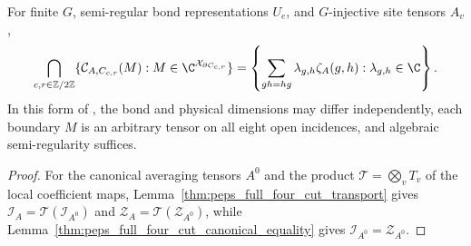 \begin{theorem}%
    \label{thm:peps_four_cut_closure}
    \leanok
    For finite $G$, semi-regular bond representations $U_e$, and
    $G$-injective site tensors $A_v$,
    \begin{align}
        \bigcap_{c,r\in\mathbb Z/2\mathbb Z}
        \{\mathcal C_{A,C_{c,r}}(M):M\in\C^{\mathcal X_{\partial C_{c,r}}}\}
        =\left\{\sum_{gh=hg}\lambda_{g,h}\zeta_A(g,h):
        \lambda_{g,h}\in\C\right\}.
        \label{eq:peps_full_four_cut_equality}
    \end{align}
    In this form of \cite[Theorem~5.5]{Schuch2010PEPS}, the bond and physical
    dimensions may differ independently, each boundary $M$ is an arbitrary
    tensor on all eight open incidences, and algebraic semi-regularity suffices.
\end{theorem}
\begin{proof}\leanok
    For the canonical averaging tensors $A^0$ and the product
    $\mathcal T=\bigotimes_vT_v$ of the local coefficient maps,
    Lemma~\ref{thm:peps_full_four_cut_transport} gives
    $\mathcal I_A=\mathcal T(\mathcal I_{A^0})$ and
    $\mathcal Z_A=\mathcal T(\mathcal Z_{A^0})$, while
    Lemma~\ref{thm:peps_full_four_cut_canonical_equality} gives
    $\mathcal I_{A^0}=\mathcal Z_{A^0}$.
\end{proof}

